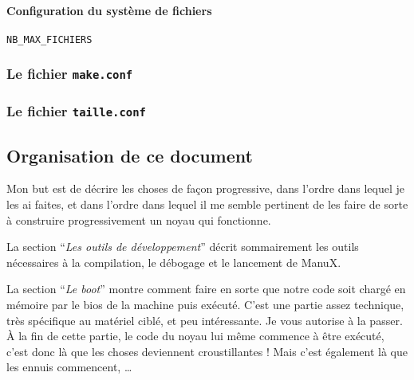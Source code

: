 %
%
%
\paragraph{Configuration du système de fichiers}

\begin{description}
   \item[{\tt NB\_MAX\_FICHIERS}]
\end{description}

%
\subsubsection{Le fichier {\tt make.conf}}

%
\subsubsection{Le fichier {\tt taille.conf}}


%   
\subsection{Organisation de ce document}

   Mon but est de décrire les choses de façon progressive, dans
l'ordre dans lequel je les ai faites, et dans l'ordre dans lequel il
me semble pertinent de les faire de sorte à construire progressivement
un noyau qui fonctionne.

   La section ``{\em Les outils de développement}'' décrit sommairement
les outils nécessaires à la compilation, le débogage et le lancement
de ManuX.

   La section ``{\em Le boot}'' montre comment faire en sorte que notre
code soit chargé en mémoire par le {\sc bios} de la machine puis
exécuté. C'est une partie assez technique, très spécifique au matériel
ciblé, et peu intéressante. Je vous autorise à la passer. À la fin de
cette partie, le code du noyau lui même commence à être exécuté, c'est
donc là que les choses deviennent croustillantes ! Mais c'est
également là que les ennuis commencent, \ldots

